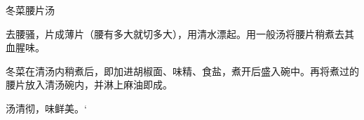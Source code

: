 \begin{recipe}{冬菜腰片汤}

\ingredients




\cooking

去腰骚，片成薄片（腰有多大就切多大），用清水漂起。用一般汤将腰片稍煮去其血腥味。

冬菜在清汤内稍煮后，即加进胡椒面、味精、食盐，煮开后盛入碗中。再将煮过的腰片放入清汤碗内，并淋上麻油即成。

\notes

汤清彻，味鲜美。‘

\end{recipe}


